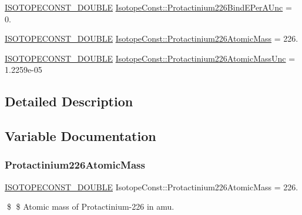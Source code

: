 \begin{DoxyCompactItemize}
\item 
\mbox{\hyperlink{group___isotope_const-_macros_ga8f45a7272ce02c0b4c65c44636ed719a}{I\+S\+O\+T\+O\+P\+E\+C\+O\+N\+S\+T\+\_\+\+D\+O\+U\+B\+LE}} \mbox{\hyperlink{group___isotope_const-_protactinium-_pa226_gab4e92a85986c98a7e0f28de53a83ba0a}{Isotope\+Const\+::\+Protactinium226\+Bind\+E\+Per\+A\+Unc}} = 0.
\item 
\mbox{\hyperlink{group___isotope_const-_macros_ga8f45a7272ce02c0b4c65c44636ed719a}{I\+S\+O\+T\+O\+P\+E\+C\+O\+N\+S\+T\+\_\+\+D\+O\+U\+B\+LE}} \mbox{\hyperlink{group___isotope_const-_protactinium-_pa226_gae1dbdd1673d5e860ba71dfd6200198e2}{Isotope\+Const\+::\+Protactinium226\+Atomic\+Mass}} = 226.
\item 
\mbox{\hyperlink{group___isotope_const-_macros_ga8f45a7272ce02c0b4c65c44636ed719a}{I\+S\+O\+T\+O\+P\+E\+C\+O\+N\+S\+T\+\_\+\+D\+O\+U\+B\+LE}} \mbox{\hyperlink{group___isotope_const-_protactinium-_pa226_gae8a1d401a911ac1758acf9aba0c513bf}{Isotope\+Const\+::\+Protactinium226\+Atomic\+Mass\+Unc}} = 1.\+2259e-\/05
\end{DoxyCompactItemize}


\subsection{Detailed Description}


\subsection{Variable Documentation}
\mbox{\label{group___isotope_const-_protactinium-_pa226_gae1dbdd1673d5e860ba71dfd6200198e2}} 
\subsubsection{\texorpdfstring{Protactinium226\+Atomic\+Mass}{Protactinium226AtomicMass}}
{\footnotesize\ttfamily \mbox{\hyperlink{group___isotope_const-_macros_ga8f45a7272ce02c0b4c65c44636ed719a}{I\+S\+O\+T\+O\+P\+E\+C\+O\+N\+S\+T\+\_\+\+D\+O\+U\+B\+LE}} Isotope\+Const\+::\+Protactinium226\+Atomic\+Mass = 226.}

\$ \$ Atomic mass of Protactinium-\/226 in amu. \mbox{\label{group___isotope_const-_protactinium-_pa226_gae8a1d401a911ac1758acf9aba0c513bf}} 
